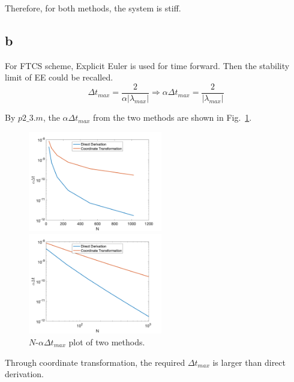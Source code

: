 \documentclass[letterpaper,10pt]{article}
\begin{document}
Therefore, for both methods, the system is stiff. 
\subsection{b}
For FTCS scheme, Explicit Euler is used for time forward. Then the stability limit of EE could be recalled. 
\begin{equation*}
  \Delta t_{max} = \frac{2}{\alpha|\lambda_{max}|}
  \Rightarrow \alpha \Delta t_{max} = \frac{2}{|\lambda_{max}|}
\end{equation*}

By $p2\_3.m$, the $\alpha \Delta t_{max}$ from the two methods are shown in Fig.~\ref{fig2_1}. 
\begin{figure}[b]
  \centering
    \begin{minipage}[t]{0.45\linewidth}
    \centering
    \includegraphics[width=2.3in]{p2_1.png}
    \end{minipage}
    \begin{minipage}[t]{0.45\linewidth}
    \centering
    \includegraphics[width=2.3in]{p2_3.png}
    \end{minipage}
  \caption{$N$-$\alpha \Delta t_{max}$ plot of two methods. }
  \label{fig2_1}
\end{figure}

Through coordinate transformation, the required $\Delta t_{max}$ is larger than direct derivation. 
\end{document}
